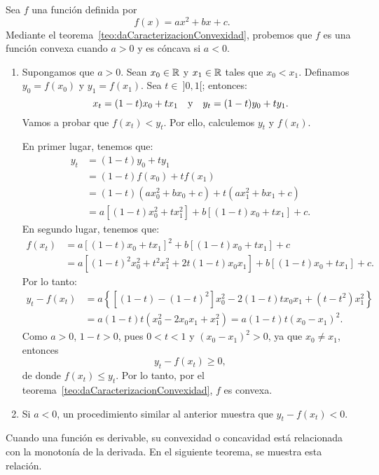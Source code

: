 \begin{exemplo}[]{}
Sea $f$ una función definida por
\[
f(x) = ax^2 + bx + c.
\]
Mediante el teorema~\ref{teo:daCaracterizacionConvexidad}, probemos que $f$ es una función convexa
cuando $a > 0$ y es cóncava si $a < 0$.

\begin{enumerate}[leftmargin=*]
\item Supongamos que $a > 0$. Sean $x_0\in\mathbb{R}$ y $x_1\in\mathbb{R}$ tales que $x_0 < x_1$. Definamos
    $y_0 = f(x_0)$ y $y_1 = f(x_1)$. Sea $t\in\ ]0,1[$; entonces:
    \[
      x_t = (1 - t)x_0 + tx_1 \quad\text{y}\quad y_t = (1 - t)y_0 + ty_1.
    \]
    Vamos a probar que $f(x_t) < y_t$. Por ello, calculemos $y_t$ y $f(x_t)$.

    En primer lugar, tenemos que:
    \begin{align*}
      y_t &= (1 - t)y_0 + ty_1 \\
          &= (1 - t)f(x_0) + tf(x_1) \\
          &= (1 - t)(ax_0^2 + bx_0 + c) + t(ax_1^2 + bx_1 + c) \\
          &= a[(1 - t)x_0^2 + tx_1^2] + b[(1-t)x_0 + tx_1] + c.
    \end{align*}
    En segundo lugar, tenemos que:
    \begin{align*}
    f(x_t) &= a[(1-t)x_0 + tx_1]^2 + b[(1-t)x_0 + tx_1] + c \\
           &= a[(1-t)^2x_0^2 + t^2x_1^2 + 2t(1-t)x_0x_1] + b[(1-t)x_0 + tx_1] + c.
    \end{align*}
    Por lo tanto:
    \begin{align*}
    y_t - f(x_t) &= a\left\{[(1-t) - (1-t)^2]x_0^2 - 2(1-t)tx_0x_1 + (t - t^2)x_1^2\right\} \\
                 &= a(1-t)t(x_0^2 - 2x_0x_1 + x_1^2) = a(1-t)t(x_0 - x_1)^2.
    \end{align*}
    Como $a > 0$, $1 - t > 0$, pues $0 < t < 1$ y $(x_0 - x_1)^2 > 0$, ya que $x_0 \neq x_1$,
    entonces
    \[
      y_t - f(x_t) \geq 0,
    \]
    de donde $f(x_t) \leq y_t$. Por lo tanto, por el
    teorema~\ref{teo:daCaracterizacionConvexidad}, $f$ es convexa.

\item Si $a < 0$, un procedimiento similar al anterior muestra que $y_t - f(x_t) < 0$.
\end{enumerate}
\end{exemplo}

Cuando una función es derivable, su convexidad o concavidad está relacionada con la monotonía de la
derivada. En el siguiente teorema, se muestra esta relación.

